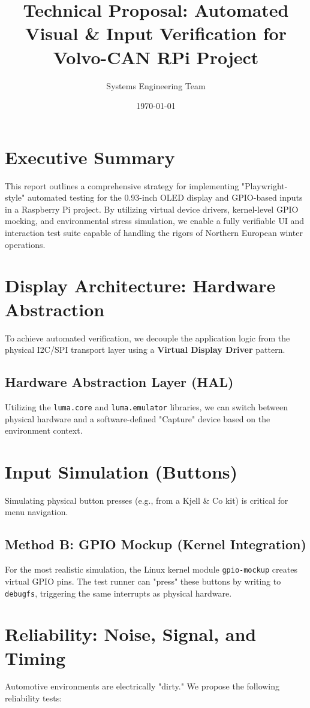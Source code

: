\documentclass[11pt, a4paper]{article}
\title{Technical Proposal: Automated Visual \& Input Verification for Volvo-CAN RPi Project}
\author{Systems Engineering Team}
\date{\today}
\begin{document}
\maketitle

\section{Executive Summary}
This report outlines a comprehensive strategy for implementing "Playwright-style" automated testing for the 0.93-inch OLED display and GPIO-based inputs in a Raspberry Pi project. By utilizing virtual device drivers, kernel-level GPIO mocking, and environmental stress simulation, we enable a fully verifiable UI and interaction test suite capable of handling the rigors of Northern European winter operations.

\section{Display Architecture: Hardware Abstraction}
To achieve automated verification, we decouple the application logic from the physical I2C/SPI transport layer using a \textbf{Virtual Display Driver} pattern.

\subsection{Hardware Abstraction Layer (HAL)}
Utilizing the \texttt{luma.core} and \texttt{luma.emulator} libraries, we can switch between physical hardware and a software-defined "Capture" device based on the environment context.

\section{Input Simulation (Buttons)}
Simulating physical button presses (e.g., from a Kjell \& Co kit) is critical for menu navigation.

\subsection{Method B: GPIO Mockup (Kernel Integration)}
For the most realistic simulation, the Linux kernel module \texttt{gpio-mockup} creates virtual GPIO pins. The test runner can "press" these buttons by writing to \texttt{debugfs}, triggering the same interrupts as physical hardware.

\section{Reliability: Noise, Signal, and Timing}
Automotive environments are electrically "dirty." We propose the following reliability tests:
\end{document}
